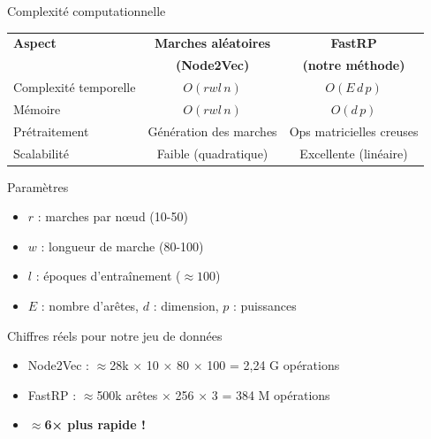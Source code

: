 \documentclass[9pt,aspectratio=169,professionalfonts]{beamer}
\begin{document}
\begin{frame}{Complexité computationnelle}
\begin{table}
\centering
\begin{tabular}{lcc}
\toprule
\textbf{Aspect} & \textbf{Marches aléatoires} & \textbf{FastRP} \\
 & \textbf{(Node2Vec)} & \textbf{(notre méthode)} \\
\midrule
Complexité temporelle & $O(rwl\,n)$ & $O(E\,d\,p)$ \\
Mémoire & $O(rwl\,n)$ & $O(d\,p)$ \\
Prétraitement & Génération des marches & Ops matricielles creuses \\
Scalabilité & Faible (quadratique) & Excellente (linéaire) \\
\bottomrule
\end{tabular}
\end{table}

\begin{block}{Paramètres}
\begin{itemize}
    \item $r$ : marches par nœud (10-50)
    \item $w$ : longueur de marche (80-100)
    \item $l$ : époques d'entraînement ($\approx 100$)
    \item $E$ : nombre d'arêtes, $d$ : dimension, $p$ : puissances
\end{itemize}
\end{block}

\begin{alertblock}{Chiffres réels pour notre jeu de données}
\begin{itemize}
    \item Node2Vec : $\approx$28k × 10 × 80 × 100 = 2,24 G opérations
    \item FastRP : $\approx$500k arêtes × 256 × 3 = 384 M opérations
    \item \textbf{$\approx$6× plus rapide !}
\end{itemize}
\end{alertblock}
\end{frame}
\end{document}
